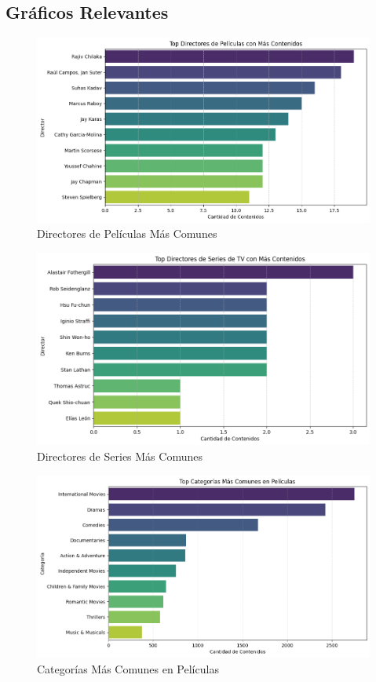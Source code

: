 \documentclass{article}
\begin{document}
\subsection{Gráficos Relevantes}

\begin{figure}[H]
    \centering
    \includegraphics[width=\textwidth]{Graphs/directores_peliculas.png}
    \caption{Directores de Películas Más Comunes}
    \label{fig:peliculas_duracion}
\end{figure}

\begin{figure}[H]
    \centering
    \includegraphics[width=\textwidth]{Graphs/directores_series.png}
    \caption{Directores de Series Más Comunes}
    \label{fig:peliculas_duracion}
\end{figure}

\begin{figure}[H]
    \centering
    \includegraphics[width=\textwidth]{Graphs/categorias_peliculas.png}
    \caption{Categorías Más Comunes en Películas}
    \label{fig:categorías_peliculas}
\end{figure}
\end{document}
